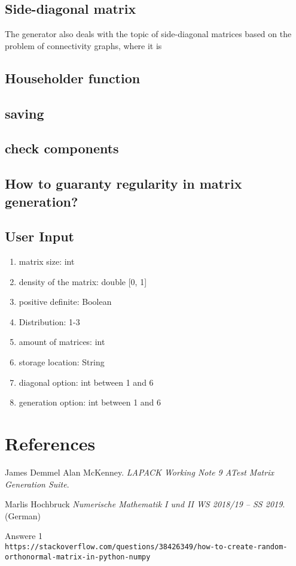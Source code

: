 \documentclass[a4paper]{article}
\begin{document}
\subsection{Side-diagonal matrix}
The generator also deals with the topic of side-diagonal matrices based on the problem of connectivity graphs, where it is

\subsection{Householder function}

\subsection{saving}

\subsection{check components}

\subsection{How to guaranty regularity in matrix generation?}

\subsection{User Input}
\begin{enumerate}
	\item matrix size: int
	\item density of the matrix: double [0, 1]
	\item positive definite: Boolean
	\item Distribution: 1-3
	\item amount of matrices: int
	\item storage location: String
	\item diagonal option: int between 1 and 6
	\item generation option: int between 1 and 6
\end{enumerate}

\newpage

\section{References}
\begin{thebibliography}{9}
	James Demmel Alan McKenney. 
	\textit{LAPACK Working Note 9 ATest Matrix Generation Suite}. 
	
	Marlis Hochbruck
	\textit{Numerische Mathematik I und II WS 2018/19 – SS 2019}. (German)  
	
	Answere 1
	\\\texttt{https://stackoverflow.com/questions/38426349/how-to-create-random-orthonormal-matrix-in-python-numpy}
\end{thebibliography}
\end{document}
